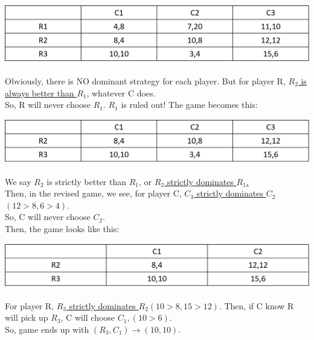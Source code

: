 \documentclass[12pt]{article}
\newcommand{\uu}[1]{\underline{#1}}
\newcommand{\e}[1]{$ #1 $}
\begin{document}
\begin{spacing}{1.5}
            \begin{center}
                \includegraphics[scale = .5]{pic/lecture3/iterated_elimination_initial.png}
            \end{center}
            
            Obviously, there is NO dominant strategy for each player. But for player R, \uu{\e{R_2}
            is always better than \e{R_1}}, whatever C does.\\
            So, R will never choose \e{R_1}. \e{R_1} is ruled out! The game becomes this:

            \begin{center}
                \includegraphics[scale = .5]{pic/lecture3/IE_R1_rule_out.png}
            \end{center}

            We say \e{R_2} is strictly better than \e{R_1}, or \underline{\e{R_2} strictly
            dominates \e{R_1}.}\\
            Then, in the revised game, we see, for player C, \underline{\e{C_3} strictly
            dominates \e{C_2} \e{(12 > 8, 6 > 4)}}.\\
            So, C will never choose \e{C_2}.\\

            Then, the game looks like this:

            \begin{center}
                \includegraphics[scale = .5]{pic/lecture3/IE_R1_C2_rule_out.png}
            \end{center}

            For player R, \underline{\e{R_3} strictly dominates \e{R_2 (10 > 8, 15 >12)}}.
            Then, if C know R will pick up \e{R_3}, C will choose \e{C_1, (10 > 6)}.\\
            So, game ends up with \e{(R_3, C_1) \rightarrow (10,10)}.\\


\end{spacing}
\end{document}

